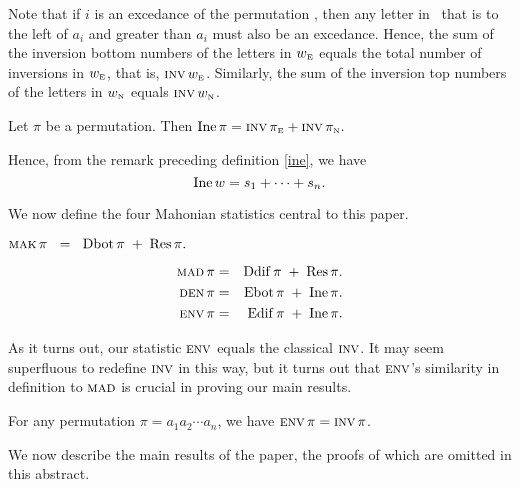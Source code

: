 Note that if $i$ is an excedance of the permutation \p, then any
letter in \p\ that is to the left of $a_i$ and greater than $a_i$ must
also be an excedance.  Hence, the sum of the inversion bottom numbers
of the letters in $\EXC{w}$ equals the total number of inversions in
$\EXC{w}$, that is, $\inv\EXC{w}$.  Similarly, the sum of the
inversion top numbers of the letters in $\NEX{w}$ equals
$\inv\NEX{w}$.

\begin{defn}\label{ine}
Let $\pi$ be a permutation. Then\/ $\ine\pi=\inv\EXC\pi+\inv\NEX\pi.$
\end{defn}
Hence, from the remark preceding definition \ref{ine}, we have
\begin{equation}
\ine w=s_1+\cdots+s_n.
\end{equation}

\newcommand\kk{\kern 6pt}

We now define the four Mahonian statistics central to this paper.
\begin{defn}
\hspace*{23mm}$\mak\pi\kk = \kk \dbot\pi \+ \res\pi.$
\end{defn}


\vspace*{-12mm}

\begin{eqnarray*}
\mad\pi&=&\ddiff\pi \+ \res\pi.\\
\den\pi&=&\ebot\pi \+ \ine\pi.\\
\env\pi&=&\ediff\pi \+ \ine\pi.
\end{eqnarray*}


As it turns out, our statistic $\env$ equals the classical $\inv$. It
may seem superfluous to redefine $\inv$ in this way, but it turns out
that $\env$'s similarity in definition to $\mad$ is crucial in proving
our main results.

\begin{thm}\label{envinv}
  For any permutation $\pi= a_1a_2\cdots a_n$, we have
  $\env\pi=\inv\pi$.
\end{thm}

We now describe the main results of the paper, the proofs of which are
omitted in this abstract.

%


